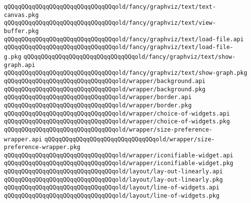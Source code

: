 \verb|qQQqqQQqqQQqqQQqqQQqqQQqqQQqqQQqold/fancy/graphviz/text/text-canvas.pkg|\newline
\verb|qQQqqQQqqQQqqQQqqQQqqQQqqQQqqQQqold/fancy/graphviz/text/view-buffer.pkg|\newline
\verb|qQQqqQQqqQQqqQQqqQQqqQQqqQQqqQQqold/fancy/graphviz/text/load-file.api|\newline
\verb|qQQqqQQqqQQqqQQqqQQqqQQqqQQqqQQqold/fancy/graphviz/text/load-file-g.pkg|\newline
\verb|qQQqqQQqqQQqqQQqqQQqqQQqqQQqqQQqold/fancy/graphviz/text/show-graph.api|\newline
\verb|qQQqqQQqqQQqqQQqqQQqqQQqqQQqqQQqold/fancy/graphviz/text/show-graph.pkg|\newline
\newline
\newline
\newline
\newline
\verb|qQQqqQQqqQQqqQQqqQQqqQQqqQQqqQQqold/wrapper/background.api|\newline
\verb|qQQqqQQqqQQqqQQqqQQqqQQqqQQqqQQqold/wrapper/background.pkg|\newline
\verb|qQQqqQQqqQQqqQQqqQQqqQQqqQQqqQQqold/wrapper/border.api|\newline
\verb|qQQqqQQqqQQqqQQqqQQqqQQqqQQqqQQqold/wrapper/border.pkg|\newline
\verb|qQQqqQQqqQQqqQQqqQQqqQQqqQQqqQQqold/wrapper/choice-of-widgets.api|\newline
\verb|qQQqqQQqqQQqqQQqqQQqqQQqqQQqqQQqold/wrapper/choice-of-widgets.pkg|\newline
\verb|qQQqqQQqqQQqqQQqqQQqqQQqqQQqqQQqold/wrapper/size-preference-wrapper.api|\newline
\verb|qQQqqQQqqQQqqQQqqQQqqQQqqQQqqQQqold/wrapper/size-preference-wrapper.pkg|\newline
\verb|qQQqqQQqqQQqqQQqqQQqqQQqqQQqqQQqold/wrapper/iconifiable-widget.api|\newline
\verb|qQQqqQQqqQQqqQQqqQQqqQQqqQQqqQQqold/wrapper/iconifiable-widget.pkg|\newline
\newline
\verb|qQQqqQQqqQQqqQQqqQQqqQQqqQQqqQQqold/layout/lay-out-linearly.api|\newline
\verb|qQQqqQQqqQQqqQQqqQQqqQQqqQQqqQQqold/layout/lay-out-linearly.pkg|\newline
\verb|qQQqqQQqqQQqqQQqqQQqqQQqqQQqqQQqold/layout/line-of-widgets.api|\newline
\verb|qQQqqQQqqQQqqQQqqQQqqQQqqQQqqQQqold/layout/line-of-widgets.pkg|\newline
